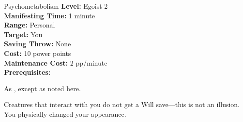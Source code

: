 {Psychometabolism}
{
	\textbf{Level:}
	Egoist 2\\
	\textbf{Manifesting Time:}
	1 minute\\
	\textbf{Range:}
	Personal\\
	\textbf{Target:}
	You\\
	\textbf{Saving Throw:}
	None\\
	\textbf{Cost:}
	10 power points\\
	\textbf{Maintenance Cost:}
	2 pp/minute\\
	\textbf{Prerequisites:}
	\\
}
{
	As , except as noted here.

	Creatures that interact with you do not get a Will save---this is not an illusion. You physically changed your appearance.
}